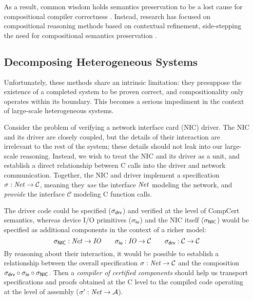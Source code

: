 \documentclass[sigplan,screen]{acmart}
\begin{document}
As a result,
common wisdom holds semantics preservation
to be a lost cause
for compositional compiler correctness \cite{next700}.
Instead,
research has focused on
compositional reasoning methods
based on contextual refinement,
side-stepping the need for compositional semantics preservation
\cite{sepcompcert,compcertm}.


\subsection{Decomposing Heterogeneous Systems} %

Unfortunately,
these methods share an intrinsic limitation:
they presuppose the existence of a completed system
to be proven correct,
and compositionality only operates within its boundary.
This becomes a serious impediment
in the context of large-scale heterogeneous systems.

\begin{example} \label{ex:nicdriver} %
Consider the problem of verifying
a network interface card (NIC) driver.
The NIC and its driver are closely coupled,
but the details of their interaction
are irrelevant to the rest of the system;
these details should not leak into our large-scale reasoning.
Instead,
we wish to treat the NIC and its driver as a unit,
and establish a direct relationship between C calls into
the driver and network communication.
Together, the NIC and driver implement
a specification $\sigma :
\mathit{Net} \rightarrow \mathcal{C}$,
meaning they \emph{use} the interface $\mathit{Net}$
modeling the network,
and \emph{provide} the interface $\mathcal{C}$
modeling C function calls.

The driver code could be specified
($\sigma_{ \mathsf{drv} }$)
and verified
at the level of CompCert semantics,
whereas device I/O primitives
($\sigma_{ \mathsf{io} }$)
and the NIC itself
($\sigma_{ \mathsf{NIC} }$)
would be specified as additional components
in the context of a richer model:
\[
  \sigma_{ \mathsf{NIC} } : \mathit{Net} \rightarrow \mathit{IO}
  \qquad
  \sigma_{ \mathsf{io} } : \mathit{IO} \rightarrow \mathcal{C}
  \qquad
  \sigma_{ \mathsf{drv} } : \mathcal{C} \rightarrow \mathcal{C}
\]
By reasoning about their interaction,
it would be possible to establish a relationship between
the overall specification $\sigma : \mathit{Net} \rightarrow \mathcal{C}$ and
the composition
$\sigma_{ \mathsf{drv} } \circ \sigma_{ \mathsf{io} } \circ \sigma_{ \mathsf{NIC} }$.
Then a \emph{compiler of certified components}
should help us transport specifications and proofs
obtained at the C level %
to the compiled code operating at the level of assembly
($\sigma' : \mathit{Net} \rightarrow \mathcal{A}$).
\end{example}
\end{document}
